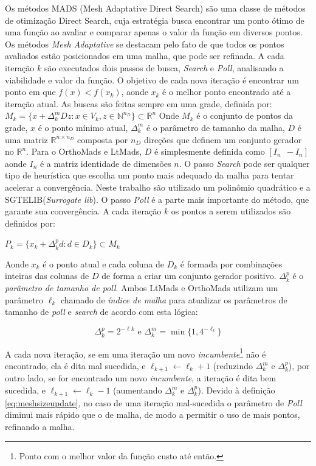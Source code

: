Os métodos MADS (Mesh Adaptative Direct Search) são uma classe de métodos de otimização Direct Search, cuja estratégia busca encontrar um ponto ótimo de uma função ao avaliar e comparar apenas o valor da função em diversos pontos\cite{AuDe2006}.
%
Os métodos \textit{Mesh Adaptative} se destacam pelo fato de que todos os pontos avaliados estão posicionados em uma malha, que pode ser refinada.
%
A cada iteração $ k $ são executados dois passos de busca, \textit{Search} e \textit{Poll}, analisando a viabilidade e valor da função. O objetivo de cada nova iteração é encontrar um ponto em que $f(x) < f(x_k)$, aonde $x_k$ é o melhor ponto encontrado até a iteração atual. 
%
As buscas são feitas sempre em uma grade, definida por:
%
$M_k = \{x + \Delta^m_kDz : x \in V_k, z \in \mathbb{N}^{n_{D}} \} \subset \mathbb{R}^n$
Onde $M_k$ é o conjunto de pontos da grade, $x$ é o ponto mínimo atual, $\Delta^m_k$ é o parâmetro de tamanho da malha, $D$ é uma matriz $\mathbb{R}^{n \times n_D}$ composta por $n_D$ direções que definem um conjunto gerador no $\mathbb{R}^n$. Para o OrthoMads e LtMads, $D$ é simplesmente definida como $[I_n~~ -I_n]$ aonde $I_n$ é a matriz identidade de dimensões $n$.
%
O passo \textit{Search} pode ser qualquer tipo de heurística que escolha um ponto mais adequado da malha para tentar acelerar a convergência. Neste trabalho são utilizado um polinômio quadrático e a SGTELIB(\textit{Surrogate lib}).
%
O passo \textit{Poll} é a parte mais importante do método, que garante sua convergência. A cada iteração $k$ os pontos a serem utilizados são definidos por:
%
\begin{center}
$P_k = \{ x_k + \Delta^p_kd : d \in D_k\} \subset M_k$
\end{center}
%
Aonde  $x_k$ é o ponto atual e cada coluna de $D_k$ é formada por combinações inteiras das colunas de $D$ de forma a criar um conjunto gerador positivo. $\Delta^p_k$ é o \textit{parâmetro de tamanho de \textit{poll}}.
%
Ambos LtMads e OrthoMads utilizam um parâmetro $\ell_k$ chamado de \textit{índice de malha} para atualizar os parâmetros de tamanho de \textit{poll} e \textit{search} de acordo com esta lógica:


\begin{equation} \label{eq:meshsizeupdate}
\Delta^p_k = 2^{-\ell k} \text{ e }  \Delta^m_k = \min\{1, 4^{-\ell_k}\}
\end{equation}

A cada nova iteração, se em uma iteração um novo \textit{incumbente}\footnote{Ponto com o melhor valor da função custo até então.} não é encontrado, ela é dita mal sucedida, e $\ell_{k+1} \gets \ell_k +1$ (reduzindo $\Delta^m_k$ e $\Delta^p_k$), por outro lado, se for encontrado um novo \textit{incumbente}, a iteração é dita bem sucedida, e $\ell_{k+1} \gets \ell_k -1$ (aumentando $\Delta^m_k$ e $\Delta^p_k$). Devido à definição \eqref{eq:meshsizeupdate}, no caso de uma iteração mal-sucedida o parâmetro de \textit{Poll} diminui mais rápido que o de malha, de modo a permitir o uso de mais pontos, refinando a malha.



